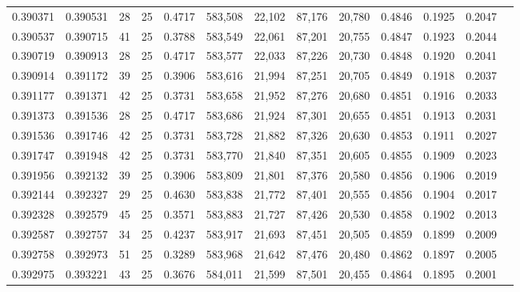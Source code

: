 \begin{tabular}{rrrrrrrrrrrrr}
0.390371 & 0.390531 &    28 &  25 &                                     0.4717 & 583,508 &  22,102 &  87,176 &  20,780 & 0.4846 & 0.1925 & 0.2047 \\
0.390537 & 0.390715 &    41 &  25 &                                     0.3788 & 583,549 &  22,061 &  87,201 &  20,755 & 0.4847 & 0.1923 & 0.2044 \\
0.390719 & 0.390913 &    28 &  25 &                                     0.4717 & 583,577 &  22,033 &  87,226 &  20,730 & 0.4848 & 0.1920 & 0.2041 \\
0.390914 & 0.391172 &    39 &  25 &                                     0.3906 & 583,616 &  21,994 &  87,251 &  20,705 & 0.4849 & 0.1918 & 0.2037 \\
0.391177 & 0.391371 &    42 &  25 &                                     0.3731 & 583,658 &  21,952 &  87,276 &  20,680 & 0.4851 & 0.1916 & 0.2033 \\
0.391373 & 0.391536 &    28 &  25 &                                     0.4717 & 583,686 &  21,924 &  87,301 &  20,655 & 0.4851 & 0.1913 & 0.2031 \\
0.391536 & 0.391746 &    42 &  25 &                                     0.3731 & 583,728 &  21,882 &  87,326 &  20,630 & 0.4853 & 0.1911 & 0.2027 \\
0.391747 & 0.391948 &    42 &  25 &                                     0.3731 & 583,770 &  21,840 &  87,351 &  20,605 & 0.4855 & 0.1909 & 0.2023 \\
0.391956 & 0.392132 &    39 &  25 &                                     0.3906 & 583,809 &  21,801 &  87,376 &  20,580 & 0.4856 & 0.1906 & 0.2019 \\
0.392144 & 0.392327 &    29 &  25 &                                     0.4630 & 583,838 &  21,772 &  87,401 &  20,555 & 0.4856 & 0.1904 & 0.2017 \\
0.392328 & 0.392579 &    45 &  25 &                                     0.3571 & 583,883 &  21,727 &  87,426 &  20,530 & 0.4858 & 0.1902 & 0.2013 \\
0.392587 & 0.392757 &    34 &  25 &                                     0.4237 & 583,917 &  21,693 &  87,451 &  20,505 & 0.4859 & 0.1899 & 0.2009 \\
0.392758 & 0.392973 &    51 &  25 &                                     0.3289 & 583,968 &  21,642 &  87,476 &  20,480 & 0.4862 & 0.1897 & 0.2005 \\
0.392975 & 0.393221 &    43 &  25 &                                     0.3676 & 584,011 &  21,599 &  87,501 &  20,455 & 0.4864 & 0.1895 & 0.2001 \\

\end{tabular}
